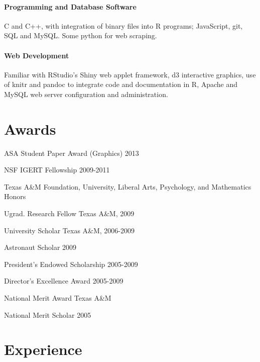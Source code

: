 \documentclass[10pt]{tccv}
\begin{document}
\paragraph{\textbf{Programming and Database Software}}
C and C++, with integration of binary files into R programs; JavaScript, git, SQL and MySQL. Some python for web scraping. \vspace{-6pt}
\paragraph{\textbf{Web Development}}
Familiar with RStudio's Shiny web applet framework, d3 interactive graphics, use of knitr and pandoc to integrate code and documentation in R, Apache and MySQL web server configuration and administration.\vspace{-6pt}

\section{Awards}
\begin{factlist}[leftmargin=.1cm,itemindent=.1cm,labelwidth=\itemindent,labelsep=.1cm]\itemsep-2pt
\item[ASA Student Paper Award (Graphics)] 2013
\item[NSF IGERT Fellowship] 2009-2011
\item[Texas A\&M] Foundation, University, Liberal Arts, Psychology, and Mathematics Honors
\item[Ugrad. Research Fellow] Texas A\&M, 2009
\item[University Scholar] Texas A\&M, 2006-2009
\item[Astronaut Scholar] 2009
\item[President's Endowed Scholarship] 2005-2009
\item[Director's Excellence Award] 2005-2009
\item[National Merit Award] Texas A\&M
\item[National Merit Scholar] 2005
\end{factlist}

\section{Experience}
\end{document}
